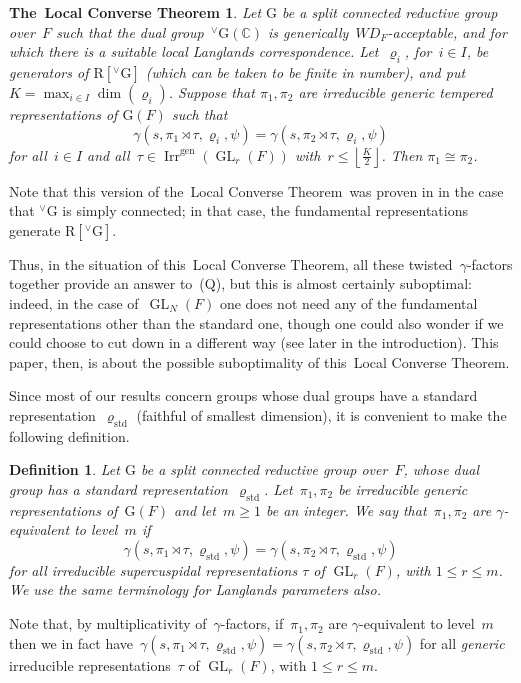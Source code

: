 \documentclass[12pt]{amsart}
\newcommand{\BC}{\mathbb {C}}
\newcommand{\GL}{\operatorname{GL}}
\newcommand{\Irr}{\operatorname{Irr}}
\newcommand{\Irrgen}{\Irr^{\operatorname{gen}}}
\newcommand{\G}{\mathrm{G}}
\newcommand{\WD}{{WD}}
\def\rhostd{\varrho_{\mathrm{std}}} %
\def\vG{{}^\vee\G}
\newtheorem{defn}[thm]{Definition}
\newtheorem{defn}[equation]{Definition}
\def\lcttheoremtitle{Local Converse Theorem}
\newtheorem*{lcttheorem}{The~\lcttheoremtitle}
\begin{document}
\begin{lcttheorem}%
Let $\G$ be a split connected reductive group over~$F$ such that the %
dual group~$\vG(\BC)$ is generically~$\WD_F$-acceptable, and for which there is a suitable local Langlands correspondence. Let~$\varrho_i$, for~$i\in I$, be generators of $\mathrm{R}[\vG]$ (which can be taken to be finite in number), and put~$K=\max_{i\in I}{\dim(\varrho_i)}$. Suppose that $\pi_1, \pi_2$ are irreducible generic tempered representations of $\G(F)$ such that
\[
\gamma(s, \pi_1\rtimes \tau,\varrho_i, \psi) = \gamma(s, \pi_2\rtimes \tau,\varrho_i, \psi)
\]
for all~$i\in I$ and all~$\tau\in\Irrgen(\GL_r(F))$ with~$r\le \left\lfloor\frac{K}{2}\right\rfloor$. Then $\pi_1 \cong \pi_2$.
\end{lcttheorem}

Note that this version of the~\lcttheoremtitle\ was proven in \cite{M24} in the case that $\vG$ is simply connected; in that case, the fundamental representations generate $\mathrm{R}[\vG]$.

Thus, in the situation of this~\lcttheoremtitle, all these twisted~$\gamma$-factors together provide an answer to~(Q), but this is almost certainly suboptimal: indeed, in the case of~$\GL_N(F)$ one does not need any of the fundamental representations other than the standard one, though one could also wonder if we could choose to cut down in a different way (see later in the introduction). This paper, then, is about the possible suboptimality of this~\lcttheoremtitle.  

Since most of our results concern groups whose dual groups have a standard representation~$\rhostd$ (faithful of smallest dimension), it is convenient to make the following definition.

\begin{defn}
Let $\G$ be a split connected reductive group over~$F$, whose dual group has a standard representation~$\rhostd$. Let~$\pi_1,\pi_2$ be irreducible generic representations of~$\G(F)$ and let~$m\ge 1$ be an integer. We say that~$\pi_1,\pi_2$ are \emph{$\gamma$-equivalent to level~$m$} if
\[
\gamma(s, \pi_1 \rtimes \tau, \rhostd, \psi) = \gamma(s, \pi_2 \rtimes \tau, \rhostd, \psi)
\]
for all irreducible supercuspidal representations $\tau$ of $\GL_r(F)$, with $1\le r\le m$. We use the same terminology for Langlands parameters also.
\end{defn}

Note that, by multiplicativity of~$\gamma$-factors, if~$\pi_1,\pi_2$ are $\gamma$-equivalent to level~$m$ then we in fact have~$\gamma(s, \pi_1 \rtimes \tau, \rhostd, \psi) = \gamma(s, \pi_2 \rtimes \tau, \rhostd, \psi)$ for all \emph{generic} irreducible representations~$\tau$ of $\GL_r(F)$, with $1\le r\le m$.
\end{document}
